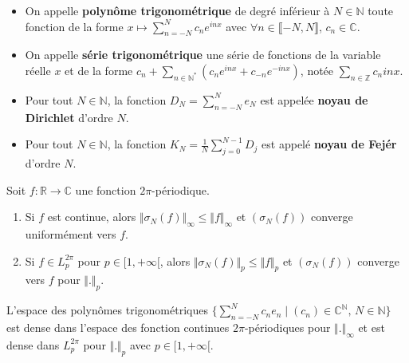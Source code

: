   \begin{definition}
    \begin{itemize}
      \item On appelle \textbf{polynôme trigonométrique} de degré inférieur à $N \in \mathbb{N}$ toute fonction de la forme $x \mapsto \sum_{n=-N}^{N} c_n e^{inx}$ avec $\forall n \in \llbracket -N, N \rrbracket$, $c_n \in \mathbb{C}$.
      \item On appelle \textbf{série trigonométrique} une série de fonctions de la variable réelle $x$ et de la forme $c_n + \sum_{n \in \mathbb{N}^*} (c_n e^{inx} + c_{-n} e^{-inx})$, notée $\sum_{n \in \mathbb{Z}} c_n {inx}$.
    \end{itemize}
  \end{definition}


  \begin{example}
    \begin{itemize}
      \item Pour tout $N \in \mathbb{N}$, la fonction $D_N = \sum_{n=-N}^{N} e_N$ est appelée \textbf{noyau de Dirichlet} d'ordre $N$.
      \item Pour tout $N \in \mathbb{N}$, la fonction $K_N = \frac{1}{N} \sum_{j=0}^{N-1} D_j$ est appelé \textbf{noyau de Fejér} d'ordre $N$.
    \end{itemize}
  \end{example}


  \begin{theorem}[Fejér]
    Soit $f : \mathbb{R} \rightarrow \mathbb{C}$ une fonction $2\pi$-périodique.
    \begin{enumerate}[label=(\roman*)]
      \item Si $f$ est continue, alors $\Vert \sigma_N(f) \Vert_\infty \leq \Vert f \Vert_\infty$ et $(\sigma_N(f))$ converge uniformément vers $f$.
      \item Si $f \in L_p^{2\pi}$ pour $p \in [1,+\infty[$, alors $\Vert \sigma_N(f) \Vert_p \leq \Vert f \Vert_p$ et $(\sigma_N(f))$ converge vers $f$ pour $\Vert . \Vert_p$.
    \end{enumerate}
  \end{theorem}

  \begin{corollary}
    L'espace des polynômes trigonométriques $\{ \sum_{n=-N}^N c_n e_n \mid (c_n) \in \mathbb{C}^{\mathbb{N}}, \, N \in \mathbb{N} \}$ est dense dans l'espace des fonction continues $2\pi$-périodiques pour $\Vert . \Vert_\infty$ et est dense dans $L_p^{2\pi}$ pour $\Vert . \Vert_p$ avec $p \in [1,+\infty[$.
  \end{corollary}

